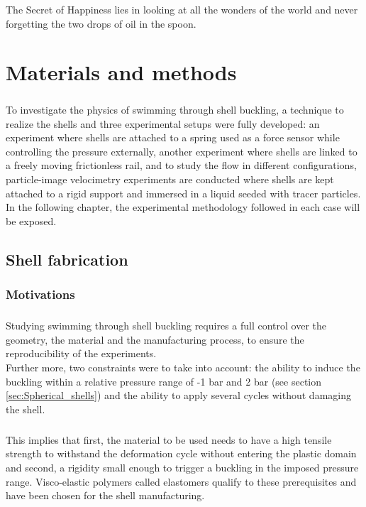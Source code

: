 \begin{savequote}
The Secret of Happiness lies in looking at all the wonders of the world and never forgetting the two drops of oil in the spoon.
\end{savequote}

\chapter{Materials and methods}
\newpage
\paragraph{}
To investigate the physics of swimming through shell buckling, a technique to realize the shells and  three experimental setups were fully developed: an experiment where shells are attached to a spring used as a force sensor while controlling the pressure externally, another experiment where shells are linked to a freely moving frictionless rail, and to study the flow in different configurations, particle-image velocimetry experiments are conducted where shells are kept attached to a rigid support and immersed in a liquid seeded with tracer particles. In the following chapter, the experimental methodology followed in each case will be exposed.

\section{Shell fabrication}
\subsection{Motivations}
\paragraph{}
Studying swimming through shell buckling requires a full control over the geometry, the material and the manufacturing process, to ensure the reproducibility of the experiments.\\
Further more, two constraints were to take into account: the ability to induce the buckling within a relative pressure range of -1 bar and 2 bar (see section \ref{sec:Spherical_shells}) and the ability to apply several cycles without damaging the shell. 
\paragraph{}
This implies that first, the material to be used needs to have a high tensile strength to withstand the deformation cycle without entering the plastic domain and second, a rigidity small enough to trigger a buckling in the imposed pressure range. Visco-elastic polymers called elastomers qualify to these prerequisites and have been chosen for the shell manufacturing.
